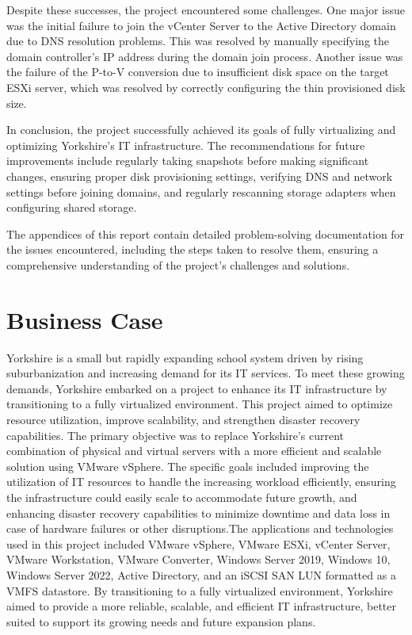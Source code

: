 \documentclass[letterpaper,12pt]{article}
\begin{document}
Despite these successes, the project encountered some challenges. One major issue was the initial failure to join the vCenter Server to the Active Directory domain due to DNS resolution problems. This was resolved by manually specifying the domain controller's IP address during the domain join process. Another issue was the failure of the P-to-V conversion due to insufficient disk space on the target ESXi server, which was resolved by correctly configuring the thin provisioned disk size.

In conclusion, the project successfully achieved its goals of fully virtualizing and optimizing Yorkshire's IT infrastructure. The recommendations for future improvements include regularly taking snapshots before making significant changes, ensuring proper disk provisioning settings, verifying DNS and network settings before joining domains, and regularly rescanning storage adapters when configuring shared storage.

The appendices of this report contain detailed problem-solving documentation for the issues encountered, including the steps taken to resolve them, ensuring a comprehensive understanding of the project's challenges and solutions.
\section{Business Case}
\label{sec:orgc0c4081}
Yorkshire is a small but rapidly expanding school system driven by rising suburbanization and increasing demand for its IT services. To meet these growing demands, Yorkshire embarked on a project to enhance its IT infrastructure by transitioning to a fully virtualized environment. This project aimed to optimize resource utilization, improve scalability, and strengthen disaster recovery capabilities. The primary objective was to replace Yorkshire's current combination of physical and virtual servers with a more efficient and scalable solution using VMware vSphere. The specific goals included improving the utilization of IT resources to handle the increasing workload efficiently, ensuring the infrastructure could easily scale to accommodate future growth, and enhancing disaster recovery capabilities to minimize downtime and data loss in case of hardware failures or other disruptions.The applications and technologies used in this project included VMware vSphere, VMware ESXi, vCenter Server, VMware Workstation, VMware Converter, Windows Server 2019, Windows 10, Windows Server 2022, Active Directory, and an iSCSI SAN LUN formatted as a VMFS datastore. By transitioning to a fully virtualized environment, Yorkshire aimed to provide a more reliable, scalable, and efficient IT infrastructure, better suited to support its growing needs and future expansion plans.
\end{document}

